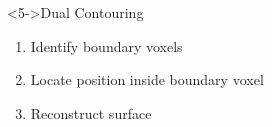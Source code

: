 \begin{frame}
\begin{minipage}[t]{0.4\linewidth}
{\begin{figure}
			\end{figure}}
				

\end{minipage}%
\hfill%
\begin{minipage}[t]{0.4\linewidth}
\begin{block}<5->{Dual Contouring}
	\begin{enumerate}
		\item<6-> Identify boundary voxels
		\item<7-> Locate position inside boundary voxel
		\item<8-> Reconstruct surface
	\end{enumerate}
	

\end{block}
\end{minipage}
\end{frame}
